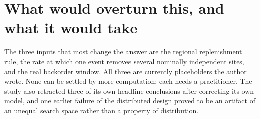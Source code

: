 \documentclass[10pt,letterpaper]{article}
\begin{document}
\section{What would overturn this, and what it would take}
The three inputs that most change the answer are the regional replenishment rule, the rate at which
one event removes several nominally independent sites, and the real backorder window. All three are
currently placeholders the author wrote. None can be settled by more computation; each needs a
practitioner. The study also retracted three of its own headline conclusions after correcting its
own model, and one earlier failure of the distributed design proved to be an artifact of an unequal
search space rather than a property of distribution.
\end{document}

